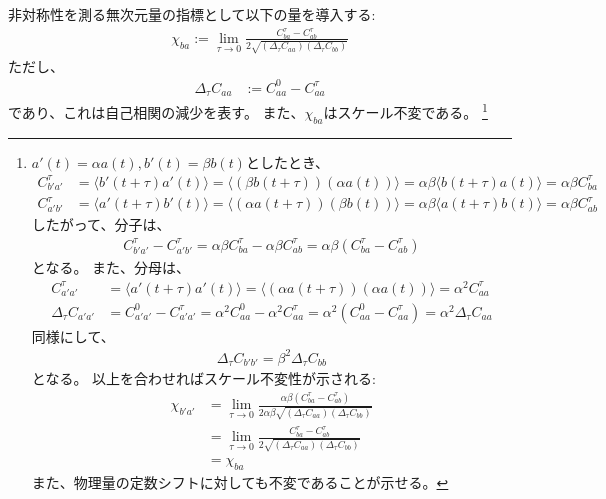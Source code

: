 \documentclass[a4paper,11pt]{jsarticle}
\numberwithin{equation}{section}
\begin{document}
非対称性を測る無次元量の指標として以下の量を導入する:
\begin{align}
    \chi_{ba} := \lim_{\tau \to 0} \frac{C_{ba}^{\tau} - C_{ab}^{\tau}}{2\sqrt{(\Delta_{\tau}C_{aa})(\Delta_{\tau} C_{bb})}}
\end{align}
ただし、
\begin{align}
    \Delta_{\tau} C_{aa} &:= C_{aa}^{0} - C_{aa}^{\tau} 
\end{align}
であり、これは自己相関の減少を表す。
また、$\chi_{ba}$はスケール不変である。
\footnote{
$a'(t) = \alpha a(t), b'(t) = \beta b(t)$としたとき、
\begin{align}
C_{b'a'}^{\tau} &= \langle b'(t+\tau)a'(t) \rangle = \langle (\beta b(t+\tau)) (\alpha a(t)) \rangle = \alpha\beta \langle b(t+\tau)a(t) \rangle = \alpha\beta C_{ba}^{\tau} \\
C_{a'b'}^{\tau} &= \langle a'(t+\tau)b'(t) \rangle = \langle (\alpha a(t+\tau)) (\beta b(t)) \rangle = \alpha\beta \langle a(t+\tau)b(t) \rangle = \alpha\beta C_{ab}^{\tau}
\end{align}
したがって、分子は、
\begin{align}
C_{b'a'}^{\tau} - C_{a'b'}^{\tau} = \alpha\beta C_{ba}^{\tau} - \alpha\beta C_{ab}^{\tau} = \alpha\beta (C_{ba}^{\tau} - C_{ab}^{\tau})
\end{align}
となる。
また、分母は、
\begin{align}
C_{a'a'}^{\tau} &= \langle a'(t+\tau)a'(t) \rangle = \langle (\alpha a(t+\tau)) (\alpha a(t)) \rangle = \alpha^2 C_{aa}^{\tau} \\
\Delta_{\tau}C_{a'a'} &= C_{a'a'}^{0} - C_{a'a'}^{\tau} = \alpha^2 C_{aa}^{0} - \alpha^2 C_{aa}^{\tau} = \alpha^2 (C_{aa}^{0} - C_{aa}^{\tau}) = \alpha^2 \Delta_{\tau}C_{aa}
\end{align}
同様にして、
\begin{align}
\Delta_{\tau}C_{b'b'} = \beta^2 \Delta_{\tau}C_{bb}
\end{align}
となる。
以上を合わせればスケール不変性が示される:
\begin{align}
\chi_{b'a'} &= \lim_{\tau\rightarrow 0} \frac{\alpha\beta (C_{ba}^{\tau} - C_{ab}^{\tau})}{2 \alpha\beta \sqrt{(\Delta_{\tau}C_{aa})(\Delta_{\tau}C_{bb})}}\\
&=\lim_{\tau\rightarrow 0} \frac{C_{ba}^{\tau} - C_{ab}^{\tau}}{2 \sqrt{(\Delta_{\tau}C_{aa})(\Delta_{\tau}C_{bb})}} \\
&= \chi_{ba}
\end{align}
また、物理量の定数シフトに対しても不変であることが示せる。
}
\end{document}
